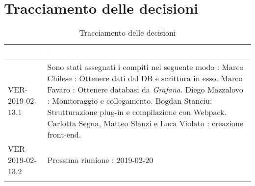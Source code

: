 
\newpage
\section{Tracciamento delle decisioni}

\begin{longtable}{|C{.40\textwidth}|C{.60\textwidth}|}
\hline
{}\textbf{\textcolor{white}{Codice}} & \textbf{\textcolor{white}{Decisione}}\\
\hline
VER-2019-02-13.1 &  Sono stati assegnati i compiti nel seguente modo : 
Marco Chilese : Ottenere dati dal DB e scrittura in esso.
Marco Favaro : Ottenere databasi da \textit{Grafana}.
Diego Mazzalovo : Monitoraggio e collegamento.
Bogdan Stanciu: Strutturazione plug-in e compilazione con Webpack.
Carlotta Segna, Matteo Slanzi e Luca Violato : creazione front-end.\\
\hline
{} VER-2019-02-13.2 & Prossima riunione : 2019-02-20 \\
\hline

\caption{Tracciamento delle decisioni}
\end{longtable}
